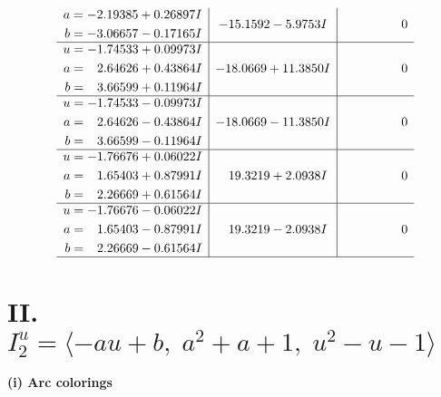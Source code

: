 \documentclass[1p]{elsarticle_modified}
\theoremstyle{definition}
\begin{document}
$$\begin{array}{c|c|c}
\begin{aligned}
a &= -2.19385 + 0.26897 I \\
b &= -3.06657 - 0.17165 I\end{aligned}
 & -15.1592 - 5.9753 I & \phantom{-0.000000 } 0 \\ \hline\begin{aligned}
u &= -1.74533 + 0.09973 I \\
a &= \phantom{-}2.64626 + 0.43864 I \\
b &= \phantom{-}3.66599 + 0.11964 I\end{aligned}
 & -18.0669 + 11.3850 I & \phantom{-0.000000 } 0 \\ \hline\begin{aligned}
u &= -1.74533 - 0.09973 I \\
a &= \phantom{-}2.64626 - 0.43864 I \\
b &= \phantom{-}3.66599 - 0.11964 I\end{aligned}
 & -18.0669 - 11.3850 I & \phantom{-0.000000 } 0 \\ \hline\begin{aligned}
u &= -1.76676 + 0.06022 I \\
a &= \phantom{-}1.65403 + 0.87991 I \\
b &= \phantom{-}2.26669 + 0.61564 I\end{aligned}
 & \phantom{-}19.3219 + 2.0938 I & \phantom{-0.000000 } 0 \\ \hline\begin{aligned}
u &= -1.76676 - 0.06022 I \\
a &= \phantom{-}1.65403 - 0.87991 I \\
b &= \phantom{-}2.26669 - 0.61564 I\end{aligned}
 & \phantom{-}19.3219 - 2.0938 I & \phantom{-0.000000 } 0\\
 \hline 
 \end{array}$$\newpage\newpage\renewcommand{\arraystretch}{1}
\centering \section*{II. $I^u_{2}= \langle - a u+b,\;a^2+a+1,\;u^2- u-1 \rangle$}
\flushleft \textbf{(i) Arc colorings}\\
\end{document}

